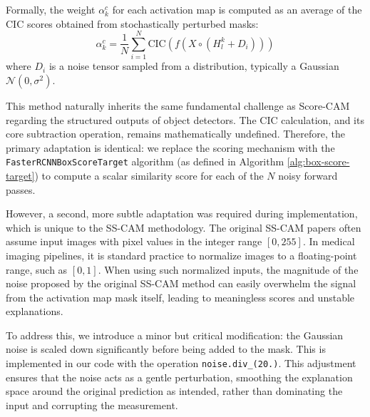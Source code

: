 Formally, the weight $\alpha^{c}_{k}$ for each activation map is computed as an average of the CIC scores obtained from stochastically perturbed masks:
\begin{equation}
    \alpha^{c}_{k} = \frac{1}{N} \sum_{i=1}^{N} \text{CIC}\left(f\left(X \circ \left(H^{k}_{l} + D_i\right)\right)\right)
    \label{eq:sscam_weight}
\end{equation}
where $D_i$ is a noise tensor sampled from a distribution, typically a Gaussian $\mathcal{N}(0, \sigma^2)$.

This method naturally inherits the same fundamental challenge as Score-CAM regarding the structured outputs of object detectors. The CIC calculation, and its core subtraction operation, remains mathematically undefined. Therefore, the primary adaptation is identical: we replace the scoring mechanism with the \texttt{FasterRCNNBoxScoreTarget} algorithm (as defined in Algorithm \ref{alg:box-score-target}) to compute a scalar similarity score for each of the $N$ noisy forward passes.

However, a second, more subtle adaptation was required during implementation, which is unique to the SS-CAM methodology. The original SS-CAM papers often assume input images with pixel values in the integer range $[0, 255]$. In medical imaging pipelines, it is standard practice to normalize images to a floating-point range, such as $[0, 1]$. When using such normalized inputs, the magnitude of the noise proposed by the original SS-CAM method can easily overwhelm the signal from the activation map mask itself, leading to meaningless scores and unstable explanations.

To address this, we introduce a minor but critical modification: the Gaussian noise is scaled down significantly before being added to the mask. This is implemented in our code with the operation \texttt{noise.div\_(20.)}. This adjustment ensures that the noise acts as a gentle perturbation, smoothing the explanation space around the original prediction as intended, rather than dominating the input and corrupting the measurement.
